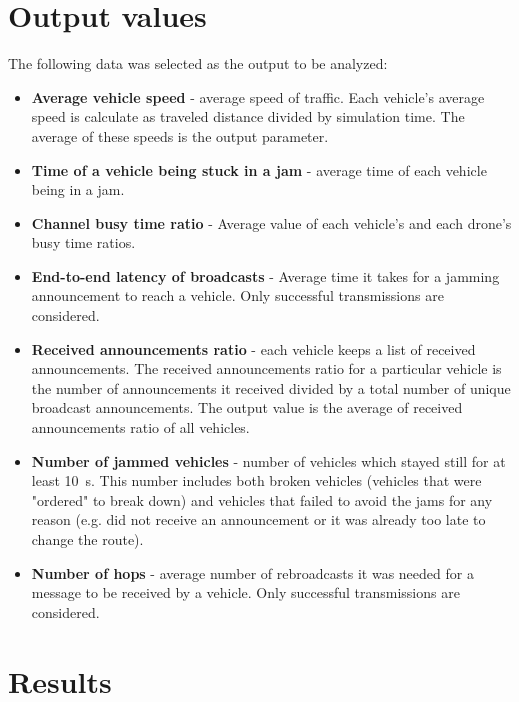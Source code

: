 \documentclass[]{nsm-thesis}
\begin{document}
\section{Output values}

The following data was selected as the output to be analyzed:

\begin{itemize}

	\item \textbf{Average vehicle speed} - average speed of traffic. Each vehicle's average speed is calculate as traveled distance divided by simulation time. The average of these speeds is the output parameter.
	
	\item \textbf{Time of a vehicle being stuck in a jam} - average time of each vehicle being in a jam.
	
	\item \textbf{Channel busy time ratio} - Average value of each vehicle's and each drone's busy time ratios.

	\item \textbf{End-to-end latency of broadcasts} - Average time it takes for a jamming announcement to reach a vehicle. Only successful transmissions are considered.

	\item \textbf{Received announcements ratio} - each vehicle keeps a list of received announcements. The received announcements ratio for a particular vehicle is the number of announcements it received divided by a total number of unique broadcast announcements. The output value is the average of received announcements ratio of all vehicles.

	\item \textbf{Number of jammed vehicles} - number of vehicles which stayed still for at least \SI{10}{\second}. This number includes both broken vehicles (vehicles that were "ordered" to break down) and vehicles that failed to avoid the jams for any reason (e.g. did not receive an announcement or it was already too late to change the route).

	\item \textbf{Number of hops} - average number of rebroadcasts it was needed for a message to be received by a vehicle. Only successful transmissions are considered.

\end{itemize}



\section{Results}
\end{document}
